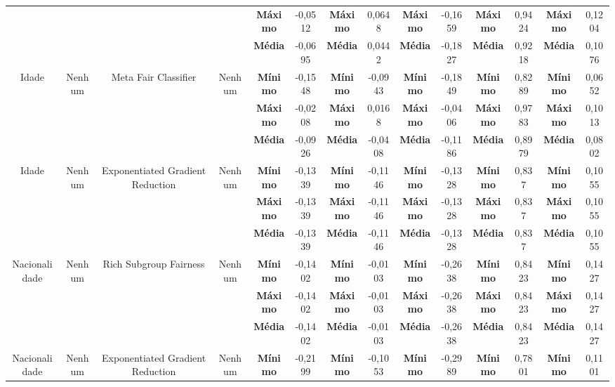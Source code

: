 \documentclass[Portugues,Final]{ic-tese-v3}
\begin{document}
\begin{table}[H]
\begin{center}
{\begin{tabular}{c|c|c|c|c|c|c|c|c|c|c|c|c|c}
             & & & & \textbf{Máximo} & -0,0512 & \textbf{Máximo} & 0,0648 & \textbf{Máximo} & -0,1659 & \textbf{Máximo} & 0,9424 & \textbf{Máximo} & 0,1204 \\
             & & & & \textbf{Média} & -0,0695 & \textbf{Média} & 0,0442 & \textbf{Média} & -0,1827 & \textbf{Média} & 0,9218 & \textbf{Média} & 0,1076 \\
            \hline
            \multirow{3}{*}{Idade} & \multirow{3}{*}{Nenhum} & \multirow{3}{*}{Meta Fair Classifier} & \multirow{3}{*}{Nenhum} & \textbf{Mínimo} & -0,1548 & \textbf{Mínimo} & -0,0943 & \textbf{Mínimo} & -0,1849 & \textbf{Mínimo} & 0,8289 & \textbf{Mínimo} & 0,0652 \\
             & & & & \textbf{Máximo} & -0,0208 & \textbf{Máximo} & 0,0168 & \textbf{Máximo} & -0,0406 & \textbf{Máximo} & 0,9783 & \textbf{Máximo} & 0,1013 \\
             & & & & \textbf{Média} & -0,0926 & \textbf{Média} & -0,0408 & \textbf{Média} & -0,1186 & \textbf{Média} & 0,8979 & \textbf{Média} & 0,0802 \\
            \hline
            \multirow{3}{*}{Idade} & \multirow{3}{*}{Nenhum} & \multirow{3}{*}{Exponentiated Gradient Reduction} & \multirow{3}{*}{Nenhum} & \textbf{Mínimo} & -0,1339 & \textbf{Mínimo} & -0,1146 & \textbf{Mínimo} & -0,1328 & \textbf{Mínimo} & 0,837 & \textbf{Mínimo} & 0,1055 \\
             & & & & \textbf{Máximo} & -0,1339 & \textbf{Máximo} & -0,1146 & \textbf{Máximo} & -0,1328 & \textbf{Máximo} & 0,837 & \textbf{Máximo} & 0,1055 \\
             & & & & \textbf{Média} & -0,1339 & \textbf{Média} & -0,1146 & \textbf{Média} & -0,1328 & \textbf{Média} & 0,837 & \textbf{Média} & 0,1055 \\
            \hline
            \multirow{3}{*}{Nacionalidade} & \multirow{3}{*}{Nenhum} & \multirow{3}{*}{Rich Subgroup Fairness} & \multirow{3}{*}{Nenhum} & \textbf{Mínimo} & -0,1402 & \textbf{Mínimo} & -0,0103 & \textbf{Mínimo} & -0,2638 & \textbf{Mínimo} & 0,8423 & \textbf{Mínimo} & 0,1427 \\
             & & & & \textbf{Máximo} & -0,1402 & \textbf{Máximo} & -0,0103 & \textbf{Máximo} & -0,2638 & \textbf{Máximo} & 0,8423 & \textbf{Máximo} & 0,1427 \\
             & & & & \textbf{Média} & -0,1402 & \textbf{Média} & -0,0103 & \textbf{Média} & -0,2638 & \textbf{Média} & 0,8423 & \textbf{Média} & 0,1427 \\
            \hline
            \multirow{3}{*}{Nacionalidade} & \multirow{3}{*}{Nenhum} & \multirow{3}{*}{Exponentiated Gradient Reduction} & \multirow{3}{*}{Nenhum} & \textbf{Mínimo} & -0,2199 & \textbf{Mínimo} & -0,1053 & \textbf{Mínimo} & -0,2989 & \textbf{Mínimo} & 0,7801 & \textbf{Mínimo} & 0,1101 \\

\end{tabular}}
\end{center}
\end{table}
\end{document}
